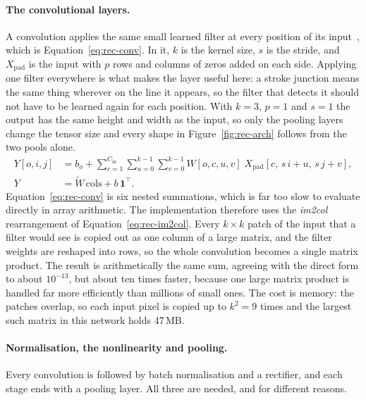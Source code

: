 \paragraph{The convolutional layers.}
A convolution applies the same small learned filter at every position of its input~\cite{yahya2021}, which is Equation~\ref{eq:rec-conv}. In it, $k$ is the kernel size, $s$ is the stride, and $X_{\mathrm{pad}}$ is the input with $p$ rows and columns of zeros added on each side. Applying one filter everywhere is what makes the layer useful here: a stroke junction means the same thing wherever on the line it appears, so the filter that detects it should not have to be learned again for each position. With $k=3$, $p=1$ and $s=1$ the output has the same height and width as the input, so only the pooling layers change the tensor size and every shape in Figure~\ref{fig:rec-arch} follows from the two pools alone.
\begin{align}
Y[o,i,j]&=b_o+\sum_{c=1}^{C_{\mathrm{in}}}\sum_{u=0}^{k-1}\sum_{v=0}^{k-1}W[o,c,u,v]\;X_{\mathrm{pad}}[c,\,s\,i+u,\,s\,j+v],\label{eq:rec-conv}\\
Y&=\tilde W\,\mathrm{cols}+b\,\mathbf 1^{\top}.\label{eq:rec-im2col}
\end{align}
Equation~\ref{eq:rec-conv} is six nested summations, which is far too slow to evaluate directly in array arithmetic. The implementation therefore uses the \emph{im2col} rearrangement of Equation~\ref{eq:rec-im2col}. Every $k\times k$ patch of the input that a filter would see is copied out as one column of a large matrix, and the filter weights are reshaped into rows, so the whole convolution becomes a single matrix product. The result is arithmetically the same sum, agreeing with the direct form to about $10^{-13}$, but about ten times faster, because one large matrix product is handled far more efficiently than millions of small ones. The cost is memory: the patches overlap, so each input pixel is copied up to $k^2=9$ times and the largest such matrix in this network holds 47\,MB.

\paragraph{Normalisation, the nonlinearity and pooling.}
Every convolution is followed by batch normalisation and a rectifier, and each stage ends with a pooling layer. All three are needed, and for different reasons.

